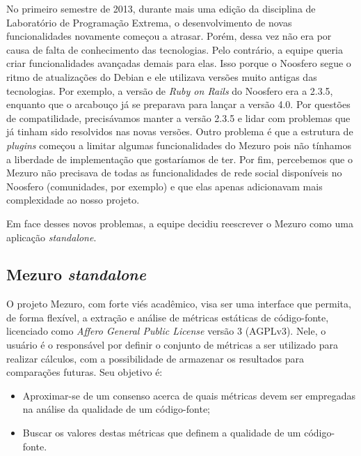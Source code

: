 \documentclass{llncs}
\begin{document}
No primeiro semestre de 2013, durante mais uma edição da disciplina de Laboratório de Programação Extrema, o desenvolvimento de novas funcionalidades novamente começou a atrasar. Porém, dessa vez não era por causa de falta de conhecimento das tecnologias. Pelo contrário, a equipe queria criar funcionalidades avançadas demais para elas. Isso porque o Noosfero segue o ritmo de atualizações do Debian e ele utilizava versões muito antigas das tecnologias. Por exemplo, a versão de \textit{Ruby on Rails} do Noosfero era a 2.3.5, enquanto que o arcabouço já se preparava para lançar a versão 4.0. Por questões de compatilidade, precisávamos manter a versão 2.3.5 e lidar com problemas que já tinham sido resolvidos nas novas versões. Outro problema é que a estrutura de \textit{plugins} começou a limitar algumas funcionalidades do Mezuro pois não tínhamos a liberdade de implementação que gostaríamos de ter. Por fim, percebemos que o Mezuro não precisava de todas as funcionalidades de rede social disponíveis no Noosfero (comunidades, por exemplo) e que elas apenas adicionavam mais complexidade ao nosso projeto.

Em face desses novos problemas, a equipe decidiu reescrever o Mezuro como uma aplicação \textit{standalone}.

\subsection{Mezuro \textit{standalone}}\label{sec:standalone}

O projeto Mezuro, com forte viés acadêmico, visa ser uma interface que permita, de forma flexível, a extração e análise de métricas estáticas de código-fonte, licenciado como \textit{Affero General Public License} versão 3 (AGPLv3). Nele, o usuário é o responsável por definir o conjunto de métricas a ser utilizado para realizar cálculos, com a possibilidade de armazenar os resultados para comparações futuras. Seu objetivo é:
\begin{itemize}
    \item Aproximar-se de um consenso acerca de quais métricas devem ser empregadas na análise da qualidade de um código-fonte;
    \item Buscar os valores destas métricas que definem a qualidade de um código-fonte.
\end{itemize}
\end{document}
